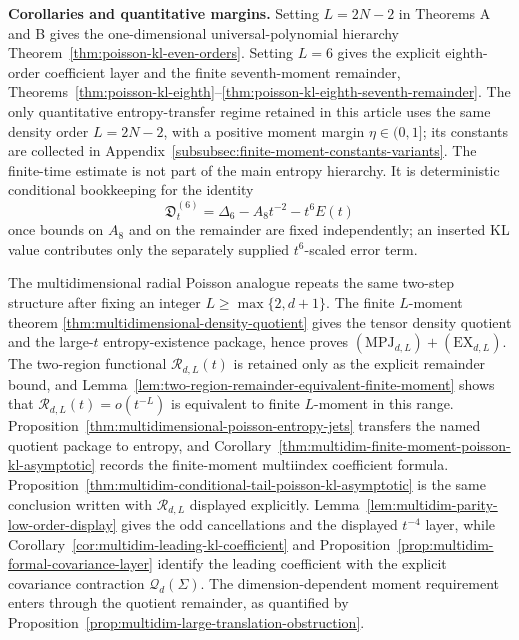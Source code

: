 \medskip
\noindent\textbf{Corollaries and quantitative margins.}
Setting \(L=2N-2\) in Theorems A and B gives the
one-dimensional universal-polynomial hierarchy
Theorem~\ref{thm:poisson-kl-even-orders}.  Setting \(L=6\) gives the explicit
eighth-order coefficient layer and the finite seventh-moment remainder,
Theorems~\ref{thm:poisson-kl-eighth}--\ref{thm:poisson-kl-eighth-seventh-remainder}.
The only quantitative entropy-transfer regime retained in this article uses
the same density order \(L=2N-2\), with a positive moment margin
\(\eta\in(0,1]\); its constants are collected in
  Appendix~\ref{subsubsec:finite-moment-constants-variants}.  The finite-time
  estimate is not part of the main entropy hierarchy.  It is deterministic
  conditional bookkeeping for the identity
\[
\mathfrak D_t^{(6)}
=\Delta_6-A_8t^{-2}-t^6E(t)
\]
once bounds on \(A_8\) and on the remainder are fixed independently; an
inserted KL value contributes only the separately supplied \(t^6\)-scaled
error term.

The multidimensional radial Poisson analogue repeats the same two-step
structure after fixing an integer \(L\ge\max\{2,d+1\}\).  The finite
\(L\)-moment theorem \ref{thm:multidimensional-density-quotient} gives the
tensor density quotient and the large-\(t\) entropy-existence package, hence
proves \((\mathrm{MPJ}_{d,L})+(\mathrm{EX}_{d,L})\).  The two-region
functional \(\mathcal R_{d,L}(t)\) is retained only as the explicit remainder
bound, and
Lemma~\ref{lem:two-region-remainder-equivalent-finite-moment} shows that
\(\mathcal R_{d,L}(t)=o(t^{-L})\) is equivalent to finite \(L\)-moment in this
range.  Proposition~\ref{thm:multidimensional-poisson-entropy-jets} transfers
the named quotient package to entropy, and
Corollary~\ref{thm:multidim-finite-moment-poisson-kl-asymptotic} records the
finite-moment multiindex coefficient formula.  Proposition~\ref{thm:multidim-conditional-tail-poisson-kl-asymptotic}
is the same conclusion written with \(\mathcal R_{d,L}\) displayed
explicitly.  Lemma~\ref{lem:multidim-parity-low-order-display}
gives the odd cancellations and the displayed \(t^{-4}\) layer, while
Corollary~\ref{cor:multidim-leading-kl-coefficient} and
Proposition~\ref{prop:multidim-formal-covariance-layer} identify the leading
coefficient with the explicit covariance contraction \(\mathcal Q_d(\Sigma)\).
The dimension-dependent moment requirement enters through the quotient
remainder, as quantified by
Proposition~\ref{prop:multidim-large-translation-obstruction}.

